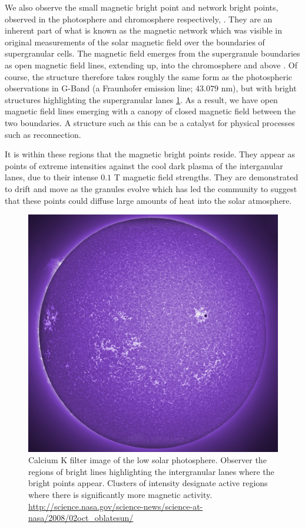We also observe the small magnetic bright point and network bright points, observed in the photosphere and chromosphere respectively, \cite{SanchesAlmeida2010} .
They are an inherent part of what is known as the magnetic network which was visible in original measurements of the solar magnetic field over the boundaries of supergranular cells.
The magnetic field emerges from the supergranule boundaries as open magnetic field lines, extending up, into the chromosphere and above \citep{Hasan2005}.
Of course, the structure therefore takes roughly the same form as the photospheric observations in G-Band (a Fraunhofer emission line; $43.079$ nm), but with bright structures highlighting the supergranular lanes \ref{fig:mag_network}.
As a result, we have open magnetic field lines emerging with a canopy of closed magnetic field between the two boundaries.
A structure such as this can be a catalyst for physical processes such as reconnection.

It is within these regions that the magnetic bright points reside.
They appear as points of extreme intensities against the cool dark plasma of the interganular lanes, due to their intense $0.1$ T magnetic field strengths.
They are demonstrated to drift and move as the granules evolve \citep{Chitta2012} which has led the community to suggest that these points could diffuse large amounts of heat into the solar atmosphere.

\begin{figure}
	\includegraphics[width=\linewidth]{Chapter1/Figs/magnetic_network}
	\caption{Calcium K filter image of the low solar photosphere. Observer the regions of bright lines highlighting the intergranular lanes where the bright points appear. Clusters of intensity designate active regions where there is significantly more magnetic activity. 
		\url{http://science.nasa.gov/science-news/science-at-nasa/2008/02oct_oblatesun/}}
	\label{fig:mag_network}
\end{figure}


